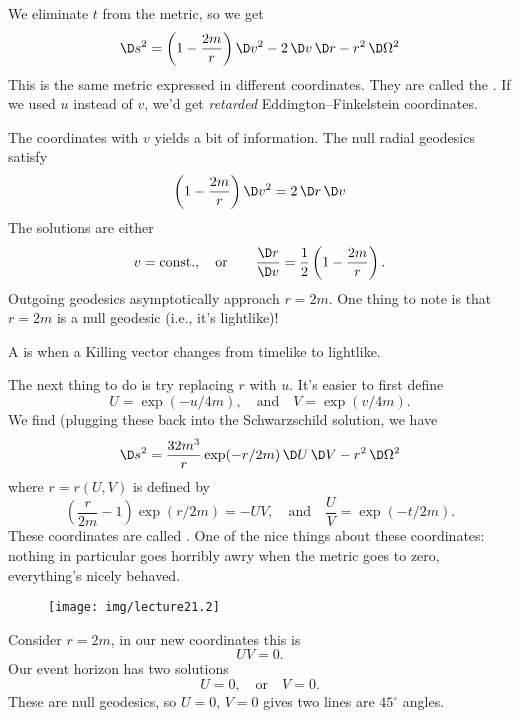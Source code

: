 We eliminate $t$ from the metric, so we get
\begin{equation}
\D s^{2} = \left(1-\frac{2m}{r}\right)\D v^{2}-2\,\D v\,\D
r-r^{2}\,\D\Omega^{2}
\end{equation}
This is the same metric expressed in different coordinates. They
are called the .
If we used $u$ instead of $v$, we'd get \emph{retarded}
Eddington--Finkelstein coordinates.

The coordinates with $v$ yields a bit of information. The null
radial geodesics satisfy
\begin{equation}
\left(1-\frac{2m}{r}\right)\D v^{2}=2\,\D r\,\D v
\end{equation}
The solutions are either
\begin{equation}
v=\mbox{const.},\quad\mbox{or}\qquad
\frac{\D r}{\D v}=\frac{1}{2}\left(1-\frac{2m}{r}\right).
\end{equation}
Outgoing geodesics asymptotically approach $r=2m$. One thing to
note is that $r=2m$ is a null geodesic (i.e., it's lightlike)!

\begin{defn}
A  is when a Killing vector changes from
timelike to lightlike.
\end{defn}

The next thing to do is
try replacing $r$ with $u$. It's easier to first define
\begin{equation}
U=\exp(-u/4m),\quad\mbox{and}\quad V=\exp(v/4m).
\end{equation}
We find (plugging these back into the Schwarzschild solution, we
have
\begin{equation}
\D s^{2}=\frac{32m^{3}}{r}\exp(-r/2m)\,\D U\,\D V -r^{2}\,\D\Omega^{2}
\end{equation}
where $r=r(U,V)$ is defined by
\begin{equation}
\left(\frac{r}{2m}-1\right)\exp(r/2m)=-UV,\quad\mbox{and}
\quad\frac{U}{V}=\exp(-t/2m).
\end{equation}
These coordinates are called .
One of the nice things about these coordinates: nothing in
particular goes horribly awry when the metric goes to zero,
everything's nicely behaved.

\begin{wrapfigure}{r}{13pc}
\vspace{-1pc}
\texttt{[image: img/lecture21.2]}
\vspace{-1pc}
\end{wrapfigure}
Consider $r=2m$, in our new coordinates this is
\begin{equation}
UV=0.
\end{equation}
Our event horizon has two solutions
\begin{equation}
U=0,\quad\mbox{or}\quad V=0.
\end{equation}
These are null geodesics, so $U=0$, $V=0$ gives two lines are
$45^{\circ}$ angles.

